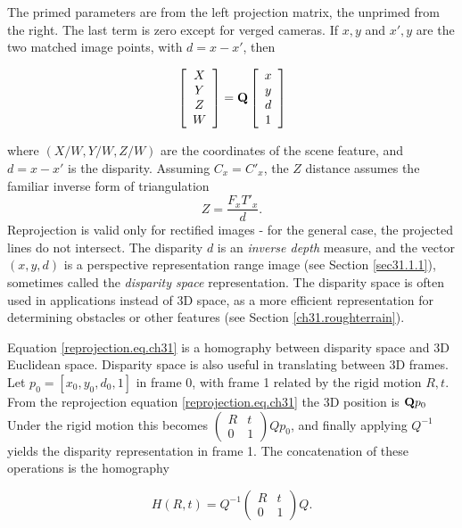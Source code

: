 \documentclass[twocolumn,oneside]{book}
\def\vec#1{\begin{array}{c}#1\end{array}}
\begin{document}
\noindent The primed parameters are from the left projection matrix, the
unprimed from the right.  The last term is zero except for verged
cameras.  If $x,y$ and $x',y$ are the two matched image points, with
$d=x-x'$, then 

\begin{eqnarray}
\left[
\vec{X\\ Y\\ Z\\ W}
\right] 
=
 \bf{Q} \left[ \vec{x\\ y\\ d \\ 1} \right]
\label{reprojection.eq.ch31}
\end{eqnarray}
 
\noindent where $(X/W, Y/W, Z/W)$ are the coordinates of the scene
feature, and $d = x - x'$ is the disparity.  Assuming $C_x = C'_x$,
the $Z$ distance assumes the familiar inverse form of triangulation
\begin{equation}
 Z = \frac{F_x T'_x}{d}.
\label{eq31.disparity-range}
\end{equation}
\noindent Reprojection is valid only for rectified images - for the general
case, the projected lines do not intersect.
The disparity $d$ is an {\em inverse depth}
measure, and the vector $(x,y,d)$ is a perspective representation
range image (see Section \ref{sec31.1.1}), sometimes called the {\em
disparity space} representation.  The disparity space is often used in
applications instead of 3D space, as a more efficient representation
for determining obstacles or other features (see Section
\ref{ch31.roughterrain}).

Equation \ref{reprojection.eq.ch31} is a homography between disparity
space and 3D Euclidean space.  Disparity space is also useful in
translating between 3D frames.  Let $p_0 = [x_0,y_0,d_0,1]$ in frame
0, with frame 1 related by the rigid motion $R,t$.  From the
reprojection equation
\ref{reprojection.eq.ch31} the 3D position is ${\bf Q}p_0$ Under the
rigid motion this becomes $\left(\begin{array}{cc}R&t\\ 0 & 1
\end{array}\right)Qp_0$, and finally applying $Q^{-1}$ yields the
disparity representation in frame 1.  The concatenation of these
operations is the homography 

\begin{equation}
H(R,t) = Q^{-1}\left(\begin{array}{cc}R&t
  \\ 0 & 1 \end{array}\right)Q.  
\label{homography.eq.ch31}
\end{equation}
\end{document}
